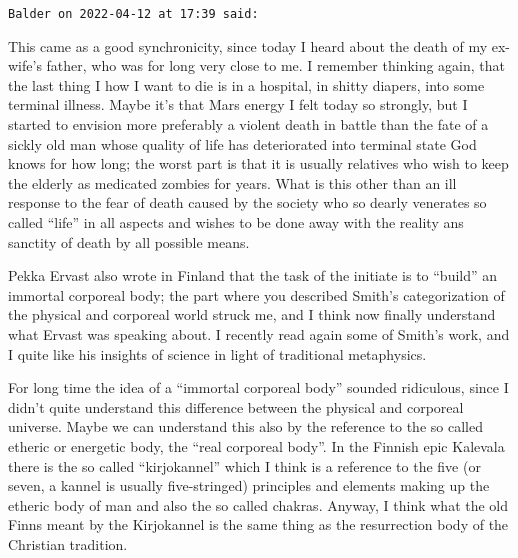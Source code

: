 \begin{footnotesize}
\begin{sffamily}
\texttt{Balder on 2022-04-12 at 17:39 said:}

This came as a good synchronicity, since today I heard about the death of my ex-wife's father, who was for long very close to me. I remember thinking again, that the last thing I how I want to die is in a hospital, in shitty diapers, into some terminal illness. Maybe it's that Mars energy I felt today so strongly, but I started to envision more preferably a violent death in battle than the fate of a sickly old man whose quality of life has deteriorated into terminal state God knows for how long; the worst part is that it is usually relatives who wish to keep the elderly as medicated zombies for years. What is this other than an ill response to the fear of death caused by the society who so dearly venerates so called ``life'' in all aspects and wishes to be done away with the reality ans sanctity of death by all possible means.

Pekka Ervast also wrote in Finland that the task of the initiate is to ``build'' an immortal corporeal body; the part where you described Smith's categorization of the physical and corporeal world struck me, and I think now finally understand what Ervast was speaking about. I recently read again some of Smith's work, and I quite like his insights of science in light of traditional metaphysics.

For long time the idea of a ``immortal corporeal body'' sounded ridiculous, since I didn't quite understand this difference between the physical and corporeal universe. Maybe we can understand this also by the reference to the so called etheric or energetic body, the ``real corporeal body''. In the Finnish epic Kalevala there is the so called ``kirjokannel'' which I think is a reference to the five (or seven, a kannel is usually five-stringed) principles and elements making up the etheric body of man and also the so called chakras. Anyway, I think what the old Finns meant by the Kirjokannel is the same thing as the resurrection body of the Christian tradition.

\end{sffamily}
\end{footnotesize}

